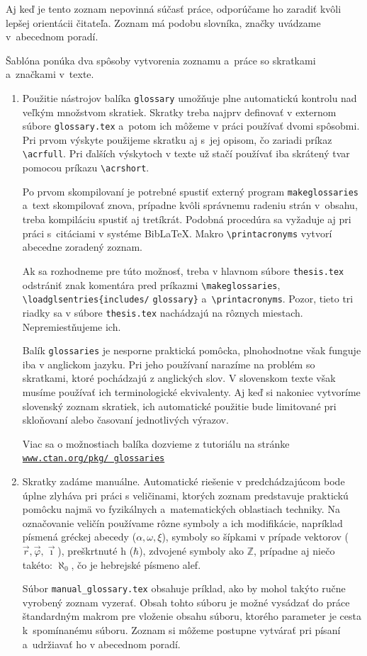 Aj keď je tento zoznam nepovinná súčasť práce,
odporúčame ho zaradiť kvôli lepšej orientácii čitateľa.
Zoznam má podobu slovníka,
značky uvádzame v~abecednom poradí.

Šablóna ponúka dva spôsoby vytvorenia zoznamu a~práce so skratkami a~značkami v~texte.
\begin{enumerate}
\item Použitie nástrojov balíka \verb|glossary| umožňuje plne automatickú kontrolu nad veľkým množstvom skratiek. Skratky treba najprv definovať v externom súbore \verb|glossary.tex| a~potom ich môžeme v práci používať dvomi spôsobmi. Pri prvom výskyte použijeme skratku aj s~jej opisom, čo zariadi príkaz \verb|\acrfull|.
Pri ďalších výskytoch v texte už stačí používať iba skrátený tvar pomocou príkazu \verb|\acrshort|.

Po prvom skompilovaní je potrebné spustiť externý program \verb|makeglossaries| a~text skompilovať znova, prípadne kvôli správnemu radeniu strán v~obsahu, treba kompiláciu spustiť aj tretíkrát.
Podobná procedúra sa vyžaduje aj pri práci s~citáciami v systéme Bib\LaTeX.
Makro \verb|\printacronyms| vytvorí abecedne zoradený zoznam.

Ak sa rozhodneme pre túto možnosť,
treba v hlavnom súbore \verb|thesis.tex| odstrániť
znak komentára pred príkazmi
\verb|\makeglossaries|, \verb|\loadglsentries{includes/| \verb|glossary}|
a~\verb|\printacronyms|. Pozor, tieto tri
riadky sa v súbore \verb|thesis.tex|
nachádzajú na rôznych miestach.
Nepremiestňujeme ich.

Balík \verb|glossaries| je nesporne praktická pomôcka, plnohodnotne však funguje iba v anglickom jazyku.
Pri jeho používaní narazíme na problém so skratkami, ktoré pochádzajú z anglických slov.
V slovenskom texte však musíme používať ich terminologické ekvivalenty.
Aj keď si nakoniec vytvoríme slovenský zoznam skratiek, ich automatické použitie bude limitované pri skloňovaní alebo časovaní jednotlivých výrazov.

Viac sa o možnostiach balíka dozvieme z tutoriálu na stránke \href{https://www.ctan.org/pkg/glossaries}{\texttt{www.ctan.org/pkg/ glossaries}}

\item Skratky zadáme manuálne.
Automatické riešenie v predchádzajúcom bode úplne zlyháva pri práci s veličinami, ktorých zoznam predstavuje praktickú pomôcku najmä vo fyzikálnych a~matematických oblastiach techniky. Na označovanie veličín používame rôzne symboly a ich modifikácie, napríklad písmená gréckej abecedy ($\alpha, \omega, \xi$), symboly so šípkami v prípade vektorov ($\vec r, \vec\varphi, \vec\imath$), preškrtnuté h ($\hbar$), zdvojené symboly ako $\mathbb Z$, prípadne aj niečo takéto: $\aleph_0$, čo je hebrejské písmeno alef.

Súbor \verb|manual_glossary.tex| obsahuje príklad, ako by mohol takýto ručne vyrobený zoznam vyzerať.
Obsah tohto súboru je možné vysádzať do práce štan\-dard\-ným makrom
\verb|| pre vloženie obsahu súboru, ktorého parameter je cesta
k~spomínanému súboru.
Zoznam si môžeme postupne vytvárať pri písaní a~udržiavať ho v abecednom poradí.
\end{enumerate}

